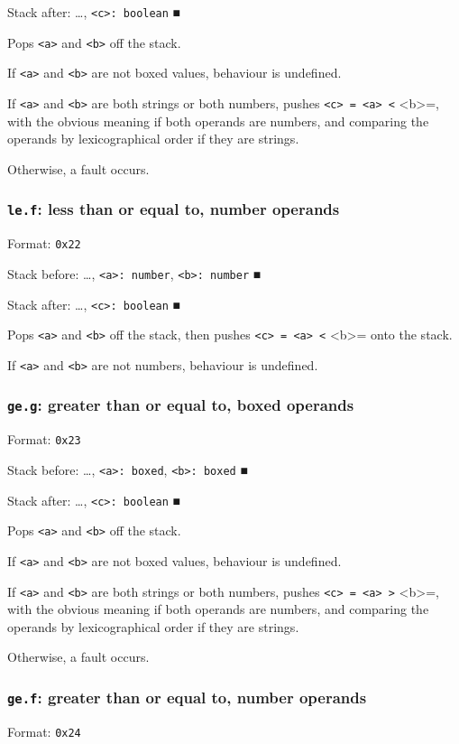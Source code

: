 Stack after: \ldots{}​, \texttt{<c>: boolean} ■

Pops \texttt{<a>} and \texttt{<b>} off the stack.

If \texttt{<a>} and \texttt{<b>} are not boxed values, behaviour is undefined.

If \texttt{<a>} and \texttt{<b>} are both strings or both numbers, pushes
\texttt{<c> = <a> <} <b>=, with the obvious meaning if both operands are
numbers, and comparing the operands by lexicographical order if they are
strings.

Otherwise, a fault occurs.

\subsubsection{\texttt{le.f}: less than or equal to, number operands}
\label{sec:orgef83a7a}
Format: \texttt{0x22}

Stack before: \ldots{}​, \texttt{<a>: number}, \texttt{<b>: number} ■

Stack after: \ldots{}​, \texttt{<c>: boolean} ■

Pops \texttt{<a>} and \texttt{<b>} off the stack, then pushes \texttt{<c> = <a> <} <b>= onto
the stack.

If \texttt{<a>} and \texttt{<b>} are not numbers, behaviour is undefined.

\subsubsection{\texttt{ge.g}: greater than or equal to, boxed operands}
\label{sec:org7e275af}
Format: \texttt{0x23}

Stack before: \ldots{}​, \texttt{<a>: boxed}, \texttt{<b>: boxed} ■

Stack after: \ldots{}​, \texttt{<c>: boolean} ■

Pops \texttt{<a>} and \texttt{<b>} off the stack.

If \texttt{<a>} and \texttt{<b>} are not boxed values, behaviour is undefined.

If \texttt{<a>} and \texttt{<b>} are both strings or both numbers, pushes
\texttt{<c> = <a> >} <b>=, with the obvious meaning if both operands are
numbers, and comparing the operands by lexicographical order if they are
strings.

Otherwise, a fault occurs.

\subsubsection{\texttt{ge.f}: greater than or equal to, number operands}
\label{sec:org24757e3}
Format: \texttt{0x24}

